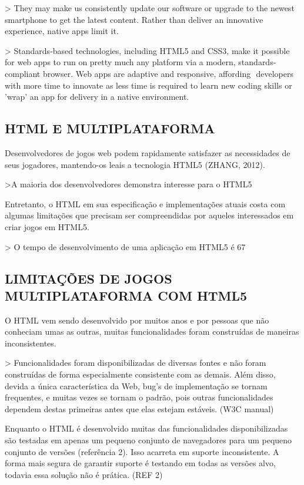 \documentclass[11pt,a4paper]{article}
\begin{document}
> They may make us consistently update our software or upgrade to the newest smartphone to get the latest content. Rather than deliver an innovative experience, native apps limit it.

> Standards-based technologies, including HTML5 and CSS3, make it possible for web apps to run on pretty much any platform via a modern, standards-compliant browser. Web apps are adaptive and responsive, affording  developers with more time to innovate as less time is required to learn new coding skills or 'wrap' an app for delivery in a native environment.

\subsection{HTML E MULTIPLATAFORMA}

Desenvolvedores de jogos web podem rapidamente satisfazer as necessidades de seus jogadores, mantendo-os leais a tecnologia HTML5 (ZHANG, 2012).

>A maioria dos desenvolvedores demonstra interesse para o HTML5 

Entretanto, o HTML em sua especificação e implementações atuais costa com algumas limitações que precisam ser compreendidas por aqueles interessados em criar jogos em HTML5.

> O tempo de desenvolvimento de uma aplicação em HTML5 é 67%

\subsection{  LIMITAÇÕES DE JOGOS MULTIPLATAFORMA COM HTML5}

O HTML vem sendo desenvolvido por muitos anos e por pessoas que não conheciam umas as outras, muitas funcionalidades foram construídas de maneiras inconsistentes.

> Funcionalidades foram disponibilizadas de diversas fontes e não foram construídas de forma especialmente consistente com as demais. Além disso, devida a única característica da Web, bug's de implementação se tornam frequentes, e muitas vezes se tornam o padrão, pois outras funcionalidades dependem destas primeiras antes que elas estejam estáveis.  (W3C manual)

Enquanto o HTML é desenvolvido muitas das funcionalidades disponibilizadas são testadas em apenas um pequeno conjunto de navegadores para um pequeno conjunto de versões (referência 2). Isso acarreta em suporte inconsistente.  A forma mais segura de garantir suporte é testando em todas as versões alvo, todavia essa solução não é prática. (REF 2)
\end{document}
